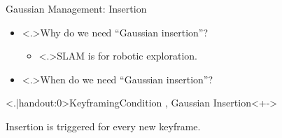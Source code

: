 \begin{Frame}{Gaussian Management: Insertion}
	\begin{itemize}
		\setlength{\itemsep}{1.5ex}
		\item<+-> \alert<.>{Why} do we need ``Gaussian insertion''?
			\vspace*{1.5ex}
			\begin{itemize}
				\setlength{\itemsep}{1.5ex}
				\item<+-> \alert<.>{SLAM} is for robotic exploration.
			\end{itemize}
	\end{itemize}
	\vspace*{\fill}
	\begin{itemize}
		\setlength{\itemsep}{1.5ex}
		\item<+-> \alert<.>{When} do we need ``Gaussian insertion''?
	\end{itemize}
	\begin{block}{\alert<.|handout:0>{Keyframing}\hfill Condition , Gaussian Insertion}<+->
		\par Insertion is triggered for every new keyframe.
	\end{block}
\end{Frame}

